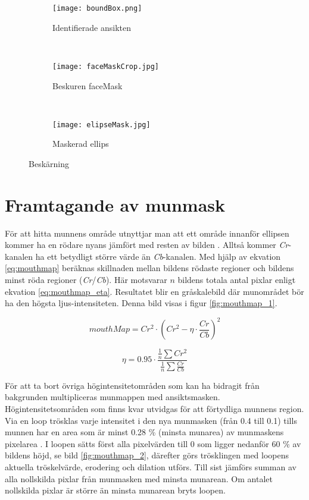 \documentclass[a4paper,12pt,oneside,final]{extbook}
\begin{document}
\begin{figure}[h]
    \centering
    \begin{subfigure}[b]{0.3\textwidth}
        \texttt{[image: boundBox.png]}
        \caption{Identifierade ansikten}
        \label{fig:boundBox}
    \end{subfigure}
    ~ 
    \begin{subfigure}[b]{0.3\textwidth}
        \texttt{[image: faceMaskCrop.jpg]}
        \caption{Beskuren faceMask}
        \label{fig:faceMaskCrop}
    \end{subfigure}
    ~ 
    \begin{subfigure}[b]{0.3\textwidth}
        \texttt{[image: elipseMask.jpg]}
        \caption{Maskerad ellips}
        \label{fig:elipseMask}
    \end{subfigure}
    \caption{Beskärning}\label{fig:yolo}
\end{figure}

\section{Framtagande av munmask}

För att hitta munnens område utnyttjar man att ett område innanför ellipsen kommer ha en rödare nyans jämfört med resten av bilden \cite{FDiCI}. Alltså kommer \textit{Cr}-kanalen ha ett betydligt större värde än \textit{Cb}-kanalen. Med hjälp av ekvation \ref{eq:mouthmap} beräknas skillnaden mellan bildens rödaste regioner och bildens minst röda regioner (\textit{Cr}/\textit{Cb}). Här motsvarar $n$ bildens totala antal pixlar enligt ekvation \ref{eq:mouthmap_eta}. Resultatet blir en gråskalebild där munområdet bör ha den högsta ljus-intensiteten. Denna bild visas i figur \ref{fig:mouthmap_1}.

\begin{equation} \label{eq:mouthmap}
mouthMap = Cr^2 \cdot (Cr^2 - \eta \cdot \frac{Cr}{Cb})^2
\end{equation}

\begin{equation} \label{eq:mouthmap_eta}
\eta = 0.95 \cdot \frac{\frac{1}{n} \sum Cr^2}{\frac{1}{n} \sum \frac{Cr}{Cb}} 
\end{equation}


För att ta bort övriga högintensitetområden som kan ha bidragit från bakgrunden multipliceras munmappen med ansiktsmasken. Högintensitetsområden som finns kvar utvidgas för att förtydliga munnens region. Via en loop trösklas varje intensitet i den nya munmasken (från 0.4 till 0.1) tills munnen har en area som är minst 0.28 \% (minsta munarea) av munmaskens pixelarea . I loopen sätts först alla pixelvärden till 0 som ligger nedanför 60 \% av bildens höjd, se bild \ref{fig:mouthmap_2}, därefter görs trösklingen med loopens aktuella tröskelvärde, erodering och dilation utförs. Till sist jämförs summan av alla nollskilda pixlar från munmasken med minsta munarean. Om antalet nollskilda pixlar är större än minsta munarean bryts loopen.  
\end{document}
